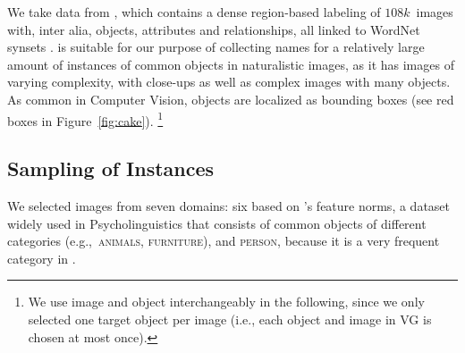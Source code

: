 
We take data from \vgenome \cite[\vg henceforth]{krishna2016visualgenome}, which
contains a dense region-based labeling of $108k$~images with, inter alia, objects, attributes and relationships,  %
all linked to WordNet synsets \cite{fellbaum1998wordnet}.
\vg is suitable for our purpose of collecting names for a relatively large amount of instances of common objects in
naturalistic images, as it has images of varying complexity, with close-ups as well as complex images with many objects.
As common in Computer Vision, objects are localized as 
 bounding boxes (see red boxes in Figure~\ref{fig:cake}).%
\footnote{We use image and object interchangeably in the following, since we only selected one target object per image (i.e., each object and image in VG is chosen at most once).}

\subsection{Sampling of Instances}
\label{ssec:sampling}
We selected images from seven domains: six based on 's \citeyear{mcrae2005semantic} feature norms, a dataset widely used in Psycholinguistics that consists of common objects of different categories (e.g.,~\textsc{animals}, \textsc{furniture}), and \textsc{person}, because it is a very frequent category in \vg.

